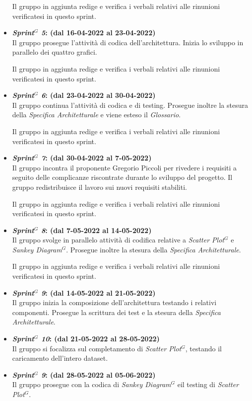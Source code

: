 \begin{itemize}
    Il gruppo in aggiunta redige e verifica i verbali relativi alle rinunioni verificatesi in questo sprint.

    \item \textbf{\textit{Sprint$^G$  5}: (dal 16-04-2022 al 23-04-2022)}\\
    Il gruppo prosegue l'attività di codica dell'architettura. Inizia lo sviluppo in parallelo dei quattro grafici. 

    Il gruppo in aggiunta redige e verifica i verbali relativi alle rinunioni verificatesi in questo sprint.

    \item \textbf{\textit{Sprint$^G$  6}: (dal 23-04-2022 al 30-04-2022)}\\
    Il gruppo continua l'attività di codica e di testing. Prosegue inoltre la stesura della \textit{Specifica Architetturale} e viene esteso il \textit{Glossario}.

    Il gruppo in aggiunta redige e verifica i verbali relativi alle rinunioni verificatesi in questo sprint.

    \item \textbf{\textit{Sprint$^G$  7}: (dal 30-04-2022 al 7-05-2022)}\\
    Il gruppo incontra il proponente Gregorio Piccoli per rivedere i requisiti a seguito delle complicanze riscontrate durante lo sviluppo del progetto.
    Il gruppo redistribuisce il lavoro sui nuovi requisiti stabiliti.

    Il gruppo in aggiunta redige e verifica i verbali relativi alle rinunioni verificatesi in questo sprint.

    \item \textbf{\textit{Sprint$^G$  8}: (dal 7-05-2022 al 14-05-2022)}\\
    Il gruppo svolge in parallelo attività di codifica relative a \textit{Scatter Plot}$^G$ e \textit{Sankey Diagram}$^G$. 
    Prosegue inoltre la stesura della \textit{Specifica Architetturale}.

    Il gruppo in aggiunta redige e verifica i verbali relativi alle rinunioni verificatesi in questo sprint.

    \item \textbf{\textit{Sprint$^G$  9}: (dal 14-05-2022 al 21-05-2022)}\\
    Il gruppo inizia la composizione dell'architettura testando i relativi componenti. Prosegue la scrittura dei test e la stesura della \textit{Specifica Architetturale}.

    \item \textbf{\textit{Sprint$^G$  10}: (dal 21-05-2022 al 28-05-2022)}\\
    Il gruppo si focalizza sul completamento di \textit{Scatter Plot}$^G$, testando il caricamento dell'intero dataset. 

    \item \textbf{\textit{Sprint$^G$  9}: (dal 28-05-2022 al 05-06-2022)}\\
    Il gruppo prosegue con la codica di \textit{Sankey Diagram}$^G$ eil testing di \textit{Scatter Plot}$^G$. 

\end{itemize}


